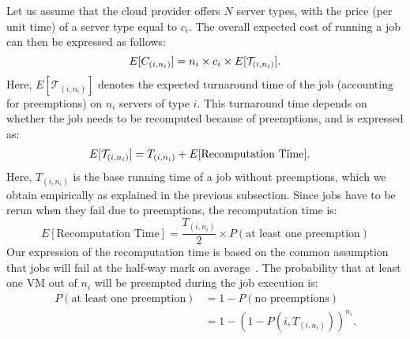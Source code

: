 



Let us assume that the cloud provider offers $N$ server types, with the price (per unit time) of a server type equal to $c_i$. 
The overall expected cost of running a job can then be expressed as follows:
\begin{equation}
  \label{eq:e-cost}
\vspace*{\eqnspace}
  E[C_{( i,n_i )}] = n_i\times c_i \times E[\mathcal{T}_{( i,n_i )}].
\end{equation}
Here, $E[\mathcal{T}_{( i,n_i )}]$ denotes the expected turnaround time of the job (accounting for preemptions) on $n_i$ servers of type $i$.
%
This turnaround time depends on whether the job needs to be recomputed because of preemptions, and is expressed as:
\begin{align}
  \label{eq:turnaround}
  \vspace*{\eqnspace}
  E[\mathcal{T}_{( i,n_i )}] &= T_{( i,n_i )} + E[\text{Recomputation Time}].
\end{align}
Here, $T_{( i,n_i )}$ is the base running time of a job without preemptions, which we obtain empirically as explained in the previous subsection.
Since jobs have to be rerun when they fail due to preemptions, the recomputation time is:
\begin{equation}
  \label{eq:recomput}
   E[\text{Recomputation Time}] = \frac{T_{( i,n_i )}}{2} \times P(\text{at least one preemption})
 \end{equation}
 Our expression of the recomputation time is based on the common assumption that jobs will fail at the half-way mark on average~\cite{daly2006higher, bougeret_checkpointing_2011}. 
%
 The probability that at least one VM out of $n_i$ will be preempted during the job execution is:
\begin{align}
  \label{eq:pfail1}
  P(\text{at least one preemption}) &= 1-P(\text{no preemptions}) \\
                                 &= 1-\left(1-P\left(i,T_{(i, n_i)}\right)\right)^{n_i}.
\end{align}

